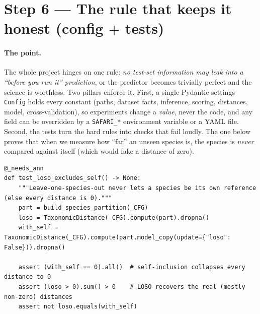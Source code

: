 \documentclass[11pt,a4paper]{article}
\newcommand{\code}[1]{\texttt{#1}}
\newcommand{\srcfile}[1]{\smallskip\noindent{\footnotesize\color{navy}\ttfamily\textbf{#1}}\par\nobreak\vspace{-0.15em}}
\begin{document}
\section{Step 6 --- The rule that keeps it honest (config $+$ tests)}

\paragraph{The point.}
The whole project hinges on one rule: \emph{no test-set information may leak into a ``before you run it''
prediction}, or the predictor becomes trivially perfect and the science is worthless. Two pillars enforce
it. First, a single Pydantic-settings \code{Config} holds every constant (paths, dataset facts, inference,
scoring, distances, model, cross-validation), so experiments change a \emph{value}, never the code, and any
field can be overridden by a \code{SAFARI\_*} environment variable or a YAML file. Second, the tests turn
the hard rules into checks that fail loudly. The one below proves that when we measure how ``far'' an
unseen species is, the species is \emph{never} compared against itself (which would fake a distance of
zero).

\srcfile{tests/test\_leakage.py}
\begin{lstlisting}[style=py]
@_needs_ann
def test_loso_excludes_self() -> None:
    """Leave-one-species-out never lets a species be its own reference (else every distance is 0)."""
    part = build_species_partition(_CFG)
    loso = TaxonomicDistance(_CFG).compute(part).dropna()
    with_self = TaxonomicDistance(_CFG).compute(part.model_copy(update={"loso": False})).dropna()

    assert (with_self == 0).all()  # self-inclusion collapses every distance to 0
    assert (loso > 0).sum() > 0    # LOSO recovers the real (mostly non-zero) distances
    assert not loso.equals(with_self)
\end{lstlisting}
\end{document}

